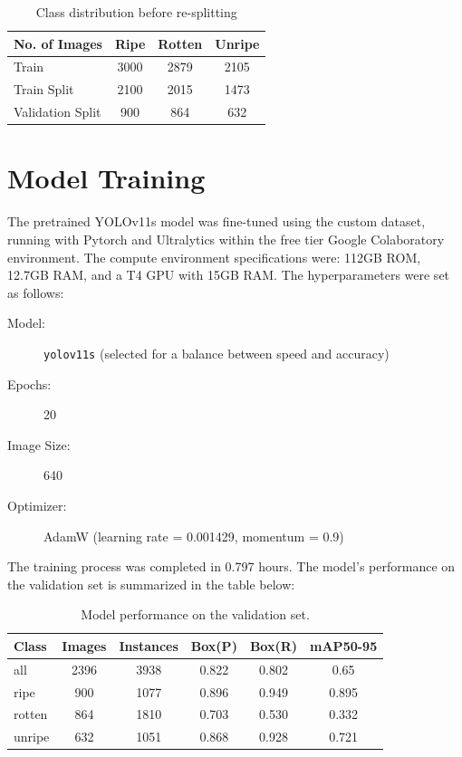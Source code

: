 {\begin{table}[!htpb]
    \caption{Class distribution before re-splitting}
    \label{tab:image-split}
    \centering
    \begin{tabular}{lccc}
        
        \toprule
        \textbf{No. of Images} & \textbf{Ripe} & \textbf{Rotten} & \textbf{Unripe} \\
        \midrule
        Train              & 3000 & 2879 & 2105 \\
        Train Split        & 2100 & 2015 & 1473 \\
        Validation Split   & 900  & 864  & 632  \\
        \bottomrule
    \end{tabular}

\end{table}


\section{Model Training}

The pretrained YOLOv11s model was fine-tuned using the custom dataset, running with Pytorch and Ultralytics within the free tier Google Colaboratory environment. The compute environment specifications were: 112GB ROM, 12.7GB RAM, and a T4 GPU with 15GB RAM. The hyperparameters were set as follows:

\begin{description}
  \item[Model:] \texttt{yolov11s} (selected for a balance between speed and accuracy)
  \item[Epochs:] 20
  \item[Image Size:] 640
  \item[Optimizer:] AdamW (learning rate = 0.001429, momentum = 0.9)
\end{description}


The training process was completed in 0.797 hours.
The model's performance on the validation set is summarized in the table below:

\begin{table}[!htpb]
    \caption{Model performance on the validation set.}
    \label{tab:model-performance}
    \centering
    \begin{tabular}{lccccc}
       
        \toprule
        \textbf{Class} & \textbf{Images} & \textbf{Instances} & \textbf{Box(P)} & \textbf{Box(R)} & \textbf{mAP50-95} \\
        \midrule
        all    & 2396 & 3938 & 0.822 & 0.802 & 0.65 \\
        ripe   & 900  & 1077 & 0.896 & 0.949 & 0.895 \\
        rotten & 864  & 1810 & 0.703 & 0.530 & 0.332 \\
        unripe & 632  & 1051 & 0.868 & 0.928 & 0.721 \\
        \bottomrule
    \end{tabular}
        

\end{table}}
